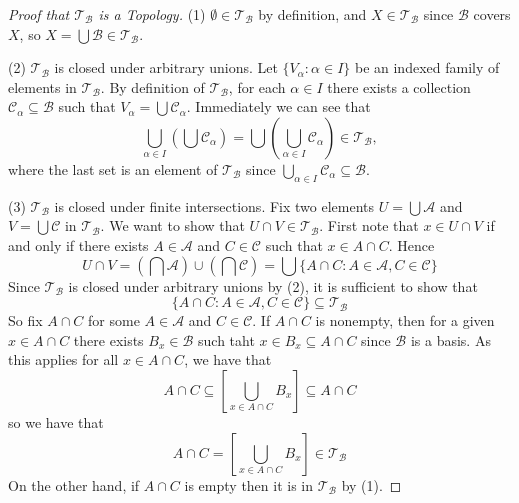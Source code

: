 \begin{proof}[Proof that $\mathcal{T}_{\mathcal{B}}$ is a Topology]
    (1) $\emptyset \in \mathcal{T}_{\mathcal{B}}$ by definition, and $X \in \mathcal{T}_{\mathcal{B}}$ since $\mathcal{B}$ covers $X$, so $X = \bigcup\mathcal{B} \in \mathcal{T}_{\mathcal{B}}$.

    
    (2) $\mathcal{T}_{\mathcal{B}}$ is closed under arbitrary unions. Let $\{V_{\alpha}:\alpha \in I\}$ be an indexed family of elements in $\mathcal{T}_{\mathcal{B}}$. By definition of $\mathcal{T}_{\mathcal{B}}$, for each $\alpha \in I$ there exists a collection $\mathcal{C}_{\alpha} \subseteq \mathcal{B}$ such that $V_{\alpha} = \bigcup\mathcal{C}_{\alpha}$. Immediately we can see that \begin{equation*}
        \bigcup\limits_{\alpha\in I}\left(\bigcup\mathcal{C}_{\alpha}\right) = \bigcup\left(\bigcup\limits_{\alpha \in I}\mathcal{C}_{\alpha}\right) \in \mathcal{T}_{\mathcal{B}},
    \end{equation*}
    where the last set is an element of $\mathcal{T}_{\mathcal{B}}$ since $\bigcup_{\alpha \in I}\mathcal{C}_{\alpha} \subseteq \mathcal{B}$. 


    (3) $\mathcal{T}_{\mathcal{B}}$ is closed under finite intersections. Fix two elements $U = \bigcup\mathcal{A}$ and $V = \bigcup\mathcal{C}$ in $\mathcal{T}_{\mathcal{B}}$. We want to show that $U\cap V \in \mathcal{T}_{\mathcal{B}}$. First note that $x \in U\cap V$ if and only if there exists $A \in \mathcal{A}$ and $C \in \mathcal{C}$ such that $x \in A\cap C$. Hence \begin{equation*}
        U\cap V = \left(\bigcap\mathcal{A}\right)\cup\left(\bigcap\mathcal{C}\right) = \bigcup\{A\cap C:A\in\mathcal{A},C\in\mathcal{C}\}
    \end{equation*}
    Since $\mathcal{T}_{\mathcal{B}}$ is closed under arbitrary unions by (2), it is sufficient to show that \begin{equation*}
        \{A\cap C:A \in \mathcal{A},C\in\mathcal{C}\}\subseteq \mathcal{T}_{\mathcal{B}}
    \end{equation*}
    So fix $A\cap C$ for some $A \in \mathcal{A}$ and $C \in \mathcal{C}$. If $A\cap C$ is nonempty, then for a given $x \in A\cap C$ there exists $B_x \in \mathcal{B}$ such taht $x \in B_x \subseteq A\cap C$ since $\mathcal{B}$ is a basis. As this applies for all $x \in A\cap C$, we have that \begin{equation*}
        A\cap C\subseteq \left[\bigcup\limits_{x\in A\cap C}B_x\right]\subseteq A\cap C
    \end{equation*}
    so we have that \begin{equation*}
        A\cap C = \left[\bigcup\limits_{x\in A\cap C}B_x\right] \in \mathcal{T}_{\mathcal{B}}
    \end{equation*}
    On the other hand, if $A\cap C$ is empty then it is in $\mathcal{T}_{\mathcal{B}}$ by (1).
\end{proof}


